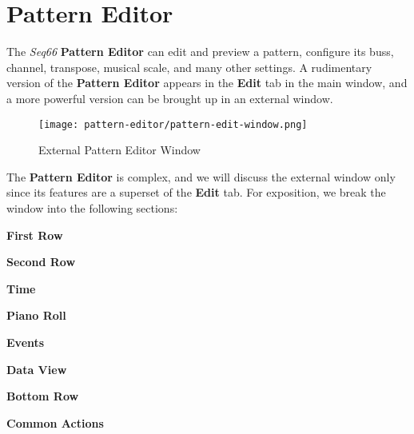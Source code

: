 %
%

\section{Pattern Editor}
\label{sec:pattern_editor}

   The \textsl{Seq66} \textbf{Pattern Editor} can edit and preview a
   pattern, configure its buss, channel, transpose, musical
   scale, and many other settings.
   A rudimentary version of the \textbf{Pattern Editor} appears in the
   \textbf{Edit} tab in the main window, and a more powerful version can be
   brought up in an external window.

\begin{figure}[H]
   \centering 
   \texttt{[image: pattern-editor/pattern-edit-window.png]}
   \caption{External Pattern Editor Window}
   \label{fig:pattern_editor_window}
\end{figure}
  
   The \textbf{Pattern Editor} is complex, and we will discuss the external
   window only since its features are a superset of the \textbf{Edit} tab.
   For exposition, we break the window into the following sections:

   \begin{enumber}
      \item \textbf{First Row}
      \item \textbf{Second Row}
      \item \textbf{Time}
      \item \textbf{Piano Roll}
      \item \textbf{Events}
      \item \textbf{Data View}
      \item \textbf{Bottom Row}
      \item \textbf{Common Actions}
   \end{enumber}

